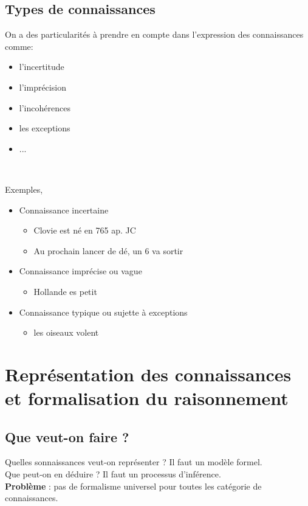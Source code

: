\documentclass[a4paper,12pt]{article}
\begin{document}
	\subsection{Types de connaissances}
	On a des particularités à prendre en compte dans l'expression des connaissances comme:
	\begin{itemize}
		\item l'incertitude
		\item l'imprécision
		\item l'incohérences
		\item les exceptions
		\item ...
	\end{itemize}
	~
	
	Exemples, 
	\begin{itemize}
		\item Connaissance incertaine
			\begin{itemize}
				\item[] \og{}Clovie est né en 765 ap. JC\fg{}
				\item[] \og{}Au prochain lancer de dé, un 6 va sortir\fg{}
			\end{itemize}
		\item Connaissance imprécise ou vague
			\begin{itemize}
				\item[] \og{}Hollande es petit\fg{}
			\end{itemize}
		\item Connaissance typique ou sujette à exceptions
			\begin{itemize}
				\item[] \og{}les oiseaux volent\fg{}
			\end{itemize}
	\end{itemize}
	
	\section{Représentation des connaissances et formalisation du raisonnement}
	\subsection{Que veut-on faire ?}
	\noindent Quelles sonnaissances veut-on représenter ? Il faut un modèle formel. \\
	Que peut-on en déduire ? Il faut un processus d'inférence. \\
	\textbf{Problème} : pas de formalisme universel pour toutes les catégorie de connaissances.\\
	
\end{document}
